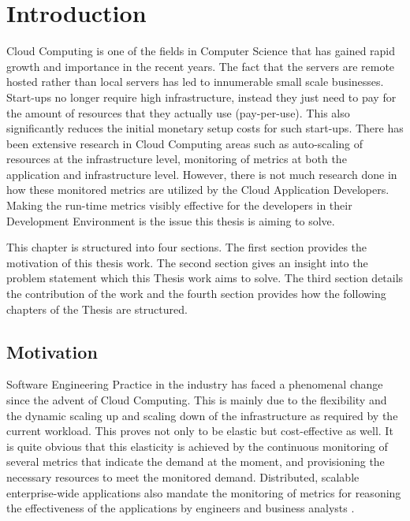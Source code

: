 \documentclass[article,type=msc,colorback,12pt,accentcolor=tud7b,table]{tudthesis}
\begin{document}
 \section{Introduction}
	
	Cloud Computing is one of the fields in Computer Science that has gained rapid growth and importance in the recent years. The fact that the servers are remote hosted rather than local servers has led to innumerable small scale businesses. Start-ups no longer require high infrastructure, instead they just need to pay for the amount of resources that they actually use (pay-per-use). This also significantly reduces the initial monetary setup costs for such start-ups. There has been extensive research in Cloud Computing areas such as auto-scaling of resources at the infrastructure level, monitoring of metrics at both the application and infrastructure level. However, there is not much research done in how these monitored metrics are utilized by the Cloud Application Developers. Making the run-time metrics visibly effective for the developers in their Development Environment is the issue this thesis is aiming to solve.
	\par This chapter is structured into four sections. The first section provides the motivation of this thesis work. The second section gives an insight into the problem statement which this Thesis work aims to solve. The third section details the contribution of the work and the fourth section provides how the following chapters of the Thesis are structured.
	
	\subsection{Motivation}
	
	Software Engineering Practice in the industry has faced a phenomenal change since the advent of Cloud Computing. This is mainly due to the flexibility and the dynamic scaling up and scaling down of the infrastructure as required by the current workload. This proves not only to be elastic but cost-effective as well. It is quite obvious that this elasticity is achieved by the continuous monitoring of several metrics that indicate the demand at the moment, and provisioning the necessary resources to meet the monitored demand. Distributed, scalable enterprise-wide applications also mandate the monitoring of metrics for reasoning the effectiveness of the applications by engineers and business analysts \cite{leitner2012application}.
	
\end{document}

